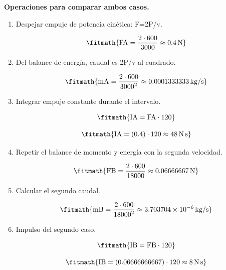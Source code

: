 \textbf{Operaciones para comparar ambos casos.}
\begin{enumerate}

\item Despejar empuje de potencia cinética: F=2P/v.

\[\fitmath{\mathrm{FA}=\frac{2\cdot 600}{3000}\approx 0.4\,\mathrm{N}}\]

\item Del balance de energía, caudal es 2P/v al cuadrado.

\[\fitmath{\mathrm{mA}=\frac{2\cdot 600}{{3000}^{2}}\approx 0.0001333333\,\mathrm{kg/s}}\]

\item Integrar empuje constante durante el intervalo.

\[\fitmath{\mathrm{IA}=\mathrm{FA}\cdot 120}\]

\[\fitmath{\mathrm{IA}=(0.4)\cdot 120\approx 48\,\mathrm{N\,s}}\]

\item Repetir el balance de momento y energía con la segunda velocidad.

\[\fitmath{\mathrm{FB}=\frac{2\cdot 600}{18000}\approx 0.06666667\,\mathrm{N}}\]

\item Calcular el segundo caudal.

\[\fitmath{\mathrm{mB}=\frac{2\cdot 600}{{18000}^{2}}\approx 3.703704\times10^{-6}\,\mathrm{kg/s}}\]

\item Impulso del segundo caso.

\[\fitmath{\mathrm{IB}=\mathrm{FB}\cdot 120}\]

\[\fitmath{\mathrm{IB}=(0.06666666667)\cdot 120\approx 8\,\mathrm{N\,s}}\]

\end{enumerate}

